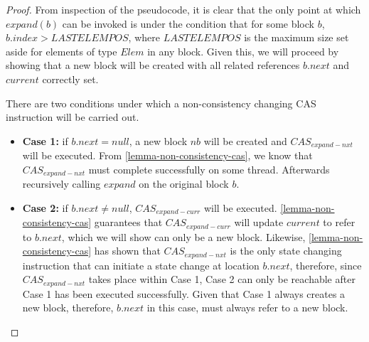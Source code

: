 \documentclass[runningheads,a4paper]{llncs}
\begin{document}
\begin{proof}
%
%

From inspection of the pseudocode, it is clear that the only point at which
$expand(b)$ can be invoked is under the condition that for some block $b$,
$b.index > LASTELEMPOS$, where $LASTELEMPOS$ is the maximum size set aside for
elements of type $Elem$ in any block. Given this, we will proceed  by showing
that a new block will be created with all related references  $b.next$ and
$current$ correctly set.

There are two conditions under which a non-consistency changing CAS
instruction will be carried out. 

\begin{itemize}  \item \textbf{Case 1:} if $b.next=null$, a new block $nb$
will be created and $CAS_{expand-nxt}$ will be executed. From
\ref{lemma-non-consistency-cas},  we know that $CAS_{expand-nxt}$
must complete successfully on some thread. Afterwards recursively calling
$expand$ on the original block $b$. \item \textbf{Case 2:} if $b.next \neq
null$, $CAS_{expand-curr}$ will be executed. \ref{lemma-non-consistency-cas}
guarantees that $CAS_{expand-curr}$ will update $current$ to refer to $b.next$,  which we
will show can only be a new block. Likewise, \ref{lemma-non-consistency-cas} 
has shown that  $CAS_{expand-nxt}$ is the only state changing instruction that can
initiate a state change  at location $b.next$, therefore, since $CAS_{expand-nxt}$ takes
place within Case 1,   Case 2 can only be reachable after Case 1 has been
executed successfully. Given  that Case 1 always creates a new block,
therefore, $b.next$ in this case, must  always refer to a new block.
\end{itemize}


\end{proof}
\end{document}
